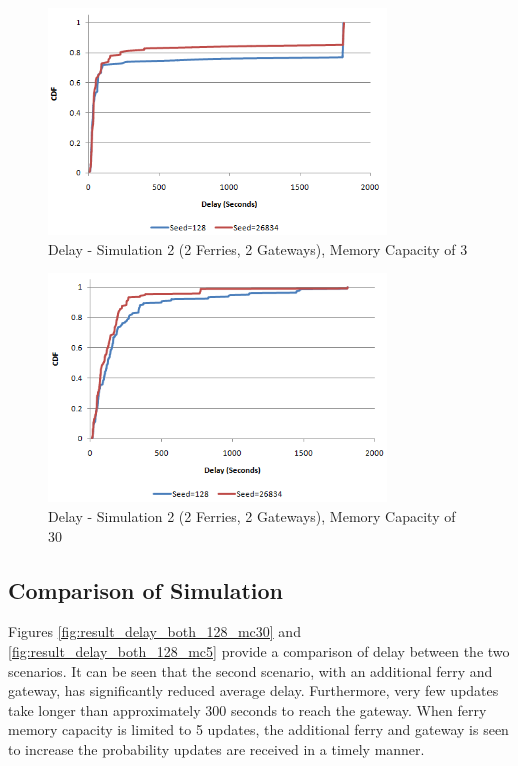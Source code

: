 \begin{figure}[htbp]
    \centering
    \includegraphics[width=0.8\textwidth]{images/result_delay_sim2byseed_mc3}
    \caption{Delay - Simulation 2 (2 Ferries, 2 Gateways), Memory Capacity of 3}
    \label{fig:result_delay_sim2byseed_mc3}
\end{figure}


\begin{figure}[htbp]
    \centering
    \includegraphics[width=0.8\textwidth]{images/result_delay_sim2byseed_mc30}
    \caption{Delay - Simulation 2 (2 Ferries, 2 Gateways), Memory Capacity of 30}
    \label{fig:result_delay_sim2byseed_mc30}
\end{figure}

\subsection{Comparison of Simulation}

Figures \ref{fig:result_delay_both_128_mc30} and \ref{fig:result_delay_both_128_mc5} provide a comparison of delay between the two scenarios.
It can be seen that the second scenario, with an additional ferry and gateway, has significantly reduced average delay.
Furthermore, very few updates take longer than approximately 300 seconds to reach the gateway.
When ferry memory capacity is limited to 5 updates, the additional ferry and gateway is seen to increase the probability updates are received in a timely manner.

